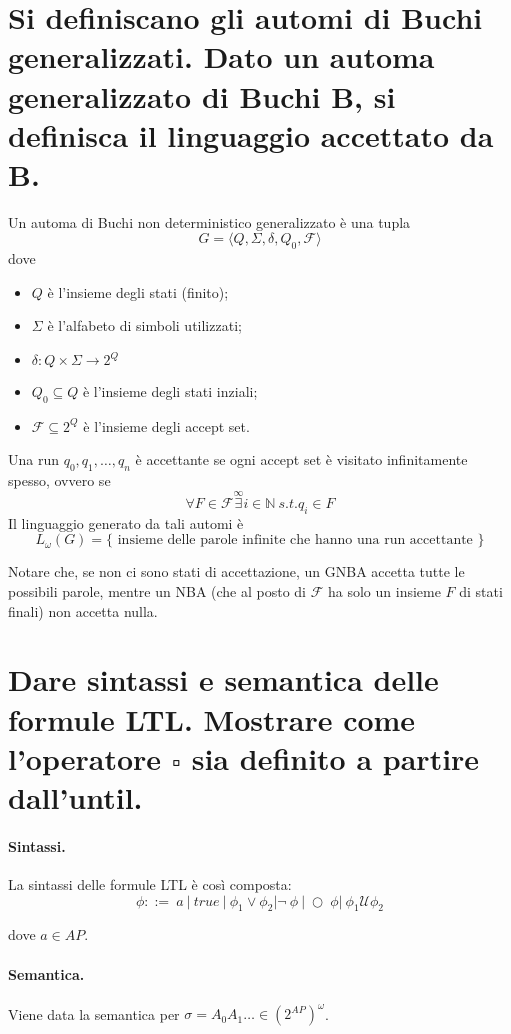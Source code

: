 \documentclass[a4paper,11pt]{article}
\newcommand{\until}{\mathcal{U}}
\begin{document}
	\section{Si definiscano gli automi di Buchi generalizzati. Dato un automa generalizzato di Buchi B, si definisca il linguaggio accettato da B.}

	Un automa di Buchi non deterministico generalizzato è una tupla \[ G = \langle Q, \Sigma, \delta, Q_0, \mathcal{F}\rangle \]
	dove \begin{itemize}
		\item $Q$ è l'insieme degli stati (finito);
		\item $\Sigma $ è l'alfabeto di simboli utilizzati;
		\item $\delta : Q \times \Sigma \to 2^Q$
		\item $Q_0 \subseteq Q$ è l'insieme degli stati inziali;
		\item $\mathcal{F} \subseteq 2^Q$ è l'insieme degli accept set.
	\end{itemize}

	Una run $q_0, q_1, \dots, q_n$ è  accettante se ogni accept set è visitato infinitamente spesso, ovvero se \[ \forall F \in \mathcal{F} \overset{\infty}{\exists} i \in \mathbb{N}\ s.t. q_i \in F\]
	Il linguaggio generato da tali automi è \[ L_\omega(G) = \lbrace  \text{ insieme delle parole infinite che hanno una run accettante } \rbrace \]

	Notare che, se non ci sono stati di accettazione, un GNBA accetta tutte le possibili parole, mentre un NBA (che al posto di $\mathcal{F}$ ha solo un insieme $F$ di stati finali) non accetta nulla.

	\section{Dare sintassi e semantica delle formule LTL. Mostrare come l'operatore $\square$ sia definito a partire dall'until.}

	\paragraph{Sintassi.} La sintassi delle formule LTL è così composta: \[ \phi ::=\ a\ \vert\ true\ \vert\ \phi_1 \vee \phi_2 \vert \neg\ \phi\ \vert\ \bigcirc\ \phi \vert\ \phi_1 \until \phi_2  \]

	dove $a \in AP$.

	\newpage
	\paragraph{Semantica.} Viene data la semantica per $\sigma = A_0A_1 \dots \in (2^{AP})^\omega$.
\end{document}
